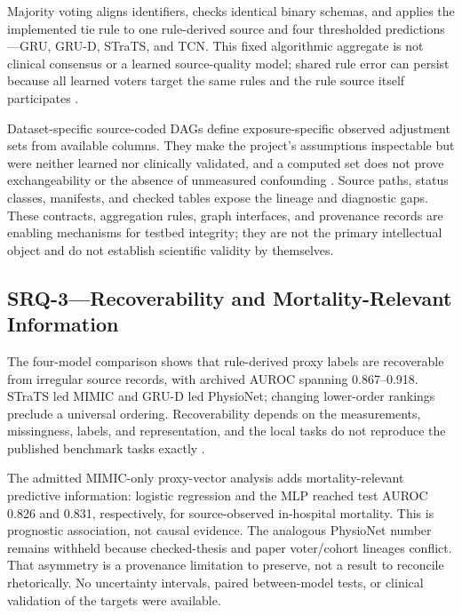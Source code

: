 Majority voting aligns identifiers, checks identical binary schemas, and applies the implemented tie rule to one rule-derived source and four thresholded predictions---GRU, GRU-D, STraTS, and TCN.  This fixed algorithmic aggregate is not clinical consensus or a learned source-quality model; shared rule error can persist because all learned voters target the same rules and the rule source itself participates \cite{ratner_et_al_2016_data_programming}.

Dataset-specific source-coded DAGs define exposure-specific observed adjustment sets from available columns.  They make the project's assumptions inspectable but were neither learned nor clinically validated, and a computed set does not prove exchangeability or the absence of unmeasured confounding \cite{pearl_1995_causal_diagrams}.  Source paths, status classes, manifests, and checked tables expose the lineage and diagnostic gaps.  These contracts, aggregation rules, graph interfaces, and provenance records are enabling mechanisms for testbed integrity; they are not the primary intellectual object and do not establish scientific validity by themselves.

\subsection{SRQ-3---Recoverability and Mortality-Relevant Information}
\label{subsec:discussion:recoverability-mortality}

The four-model comparison shows that rule-derived proxy labels are recoverable from irregular source records, with archived AUROC spanning 0.867--0.918.  STraTS led MIMIC and GRU-D led PhysioNet; changing lower-order rankings preclude a universal ordering.  Recoverability depends on the measurements, missingness, labels, and representation, and the local tasks do not reproduce the published benchmark tasks exactly \cite{sun_2026_review_irregular_medical_timeseries,tipirneni2022strats,che2018grud}.

The admitted MIMIC-only proxy-vector analysis adds mortality-relevant predictive information: logistic regression and the MLP reached test AUROC 0.826 and 0.831, respectively, for source-observed in-hospital mortality.  This is prognostic association, not causal evidence.  The analogous PhysioNet number remains withheld because checked-thesis and paper voter/cohort lineages conflict.  That asymmetry is a provenance limitation to preserve, not a result to reconcile rhetorically.  No uncertainty intervals, paired between-model tests, or clinical validation of the targets were available.


